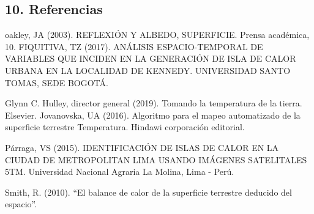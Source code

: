 \documentclass[
]{article}
\begin{document}
\hypertarget{referencias}{%
\subsection{10. Referencias}\label{referencias}}

oakley, JA (2003). REFLEXIÓN Y ALBEDO, SUPERFICIE. Prensa académica, 10.
FIQUITIVA, TZ (2017). ANÁLISIS ESPACIO-TEMPORAL DE VARIABLES QUE INCIDEN
EN LA GENERACIÓN DE ISLA DE CALOR URBANA EN LA LOCALIDAD DE KENNEDY.
UNIVERSIDAD SANTO TOMAS, SEDE BOGOTÁ.

Glynn C. Hulley, director general (2019). Tomando la temperatura de la
tierra. Elsevier. Jovanovska, UA (2016). Algoritmo para el mapeo
automatizado de la superficie terrestre Temperatura. Hindawi corporación
editorial.

Párraga, VS (2015). IDENTIFICACIÓN DE ISLAS DE CALOR EN LA CIUDAD DE
METROPOLITAN LIMA USANDO IMÁGENES SATELITALES 5TM. Universidad Nacional
Agraria La Molina, Lima - Perú.

Smith, R. (2010). ``El balance de calor de la superficie terrestre
deducido del espacio''.
\end{document}

